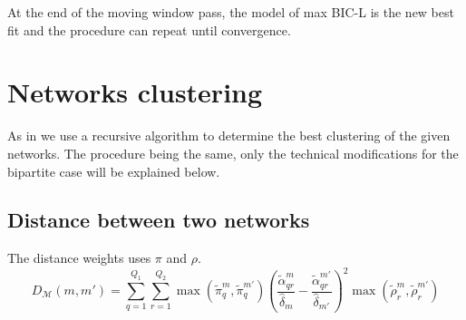 \documentclass[12pt,a4paper]{report}
\begin{document}
At the end of the moving window pass, the model of max BIC-L is the new best
fit and the procedure can repeat until convergence.

\section{Networks clustering}
As in \parencite{chabert-liddellLearningCommonStructures2023} we use a recursive
algorithm to determine the best clustering of the given networks. The procedure
being the same, only the technical modifications for the bipartite case will be
explained below.
\subsection{Distance between two networks}
The distance weights uses $\pi$ and $\rho$.
\[ 
    D_{\mathcal{M}}(m,m') = \sum_{q = 1}^{Q_1} \sum_{r = 1}^{Q_2} \max(\widetilde{\pi}_{q}^{m}, \widetilde{\pi}_{q}^{m'}) \left( \frac{\widetilde{\alpha}_{qr}^{m}}{\widehat{\delta}_{m}} - \frac{\widetilde{\alpha}_{qr}^{m'}}{\widehat{\delta}_{m'}}\right)^{2} \max(\widetilde{\rho}_{r}^{m}, \widetilde{\rho}_{r}^{m'}) 
\]


\printbibliography
\listoffigures
\listoftables
\end{document}
